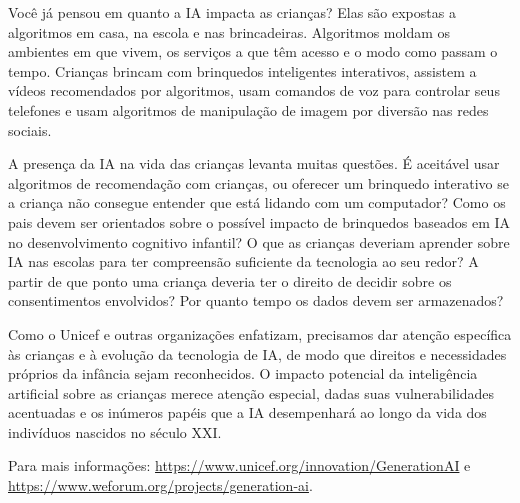 \documentclass[
  11pt,
]{article}
\begin{document}
Você já pensou em quanto a IA impacta as crianças? Elas são expostas a
algoritmos em casa, na escola e nas brincadeiras. Algoritmos moldam os
ambientes em que vivem, os serviços a que têm acesso e o modo como
passam o tempo. Crianças brincam com brinquedos inteligentes
interativos, assistem a vídeos recomendados por algoritmos, usam
comandos de voz para controlar seus telefones e usam algoritmos de
manipulação de imagem por diversão nas redes sociais.

A presença da IA na vida das crianças levanta muitas questões. É
aceitável usar algoritmos de recomendação com crianças, ou oferecer um
brinquedo interativo se a criança não consegue entender que está lidando
com um computador? Como os pais devem ser orientados sobre o possível
impacto de brinquedos baseados em IA no desenvolvimento cognitivo
infantil? O que as crianças deveriam aprender sobre IA nas escolas para
ter compreensão suficiente da tecnologia ao seu redor? A partir de que
ponto uma criança deveria ter o direito de decidir sobre os
consentimentos envolvidos? Por quanto tempo os dados devem ser
armazenados?

Como o Unicef e outras organizações enfatizam, precisamos dar atenção
específica às crianças e à evolução da tecnologia de IA, de modo que
direitos e necessidades próprios da infância sejam reconhecidos. O
impacto potencial da inteligência artificial sobre as crianças merece
atenção especial, dadas suas vulnerabilidades acentuadas e os inúmeros
papéis que a IA desempenhará ao longo da vida dos indivíduos nascidos no
século XXI.

Para mais informações:
\url{https://www.unicef.org/innovation/GenerationAI} e
\url{https://www.weforum.org/projects/generation-ai}.
\end{document}
